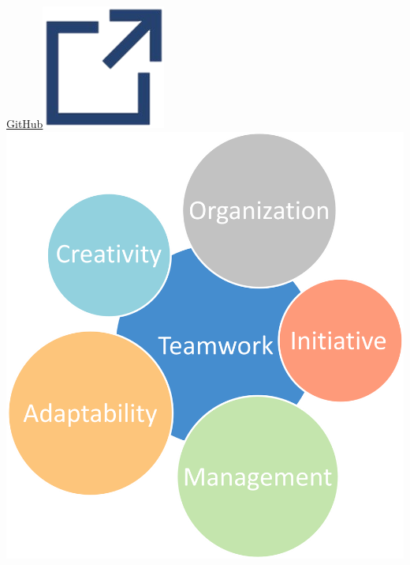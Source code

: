 \documentclass[]{friggeri-cv}
\begin{document}
\begin{aside}
\href{https://github.com/Nokheenig?tab=stars}{GitHub\hspace{1.5mm}\includegraphics[scale=0.075]{res/img/hlink.png}}\vspace{2.5mm}
\vspace{2.5mm}
\includegraphics[scale=0.40]{res/img/profileMap_EN.png}\vspace{2.5mm}

\end{aside}
\end{document}

